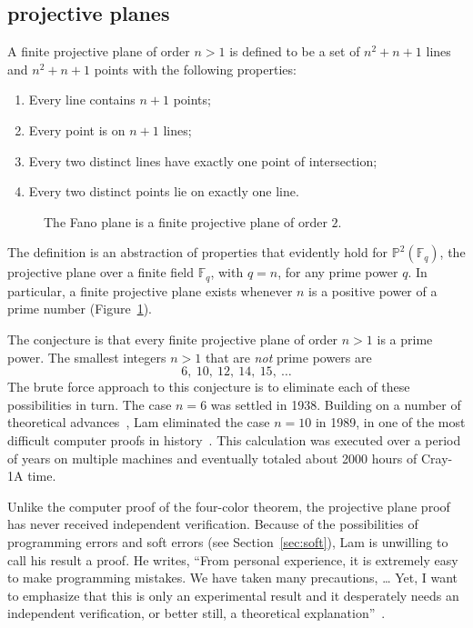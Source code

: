 \documentclass{llncs}
\newcommand{\ring}[1]{\mathbb{#1}}
\begin{document}
\subsection{projective planes}

A finite projective plane of order $n>1$ is defined to be a set of
$n^2 + n + 1$ lines and $n^2 + n+ 1$ points with the following
properties:
\begin{enumerate}
\item Every line contains $n+1$ points;
\item Every point is on $n+1$ lines;
\item Every two distinct lines have exactly one point of intersection;
\item Every two distinct points lie on exactly one line.
\end{enumerate}

\begin{figure}[h!]
  \centering
\figFANO
\caption{The Fano plane is a finite projective plane of order $2$.}
\label{fig:P2}
\end{figure}

The definition is an abstraction of properties that evidently hold for
$\ring{P}^2(\ring{F}_q)$, the projective plane over a finite field
$\ring{F}_q$, with $q=n$, for any prime power $q$.  In particular, a
finite projective plane exists whenever $n$ is a positive power of a
prime number (Figure~\ref{fig:P2}).

The conjecture is that every finite projective plane
of order $n>1$ is a prime power.  The smallest integers $n>1$
that are {\it not} prime powers are
\[
6,~10,~12,~14,~15,~\dots
\]
The brute force approach to this conjecture is to eliminate each of
these possibilities in turn.  The case $n=6$ was settled in 1938.
Building on a number of theoretical advances~\cite{MST}, Lam
eliminated the case $n=10$ in 1989, in one of the most difficult
computer proofs in history~\cite{Lam89}.  This calculation was
executed over a period of years on multiple machines and eventually
totaled about 2000 hours of Cray-1A time.

Unlike the computer proof of the four-color theorem, the
projective plane proof has never received independent verification.
Because of the possibilities of programming errors and soft errors
(see Section~\ref{sec:soft}), Lam is unwilling to call his result a
proof.  He writes, ``From personal experience, it is extremely easy to
make programming mistakes. We have taken many precautions, 
\dots
Yet, I want to emphasize that this is only an
experimental result and it desperately needs an independent
verification, or better still, a theoretical
explanation''~\cite{LamS}.
\end{document}
